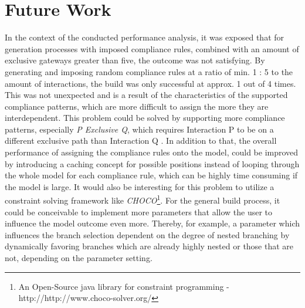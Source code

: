 \section{Future Work}
In the context of the conducted performance analysis, it was exposed that for generation processes with imposed compliance rules, combined with an amount of exclusive gateways greater than five, the outcome was not satisfying. By generating and imposing random compliance rules at a ratio of min. 1 : 5 to the amount of interactions, the build was only successful at approx. 1 out of 4 times. This was not unexpected and is a result of the characteristics of the supported compliance patterns, which are more difficult to assign the more they are interdependent. This problem could be solved by supporting more compliance patterns, especially \textit{P Exclusive Q}, which requires Interaction P to be on a different exclusive path than Interaction Q \cite{compliance_patterns}. In addition to that, the overall performance of assigning the compliance rules onto the model, could be improved by introducing a caching concept for possible positions instead of looping through the whole model for each compliance rule, which can be highly time consuming if the model is large. It would also be interesting for this problem to utilize a constraint solving framework like \textit{CHOCO}\footnote{An Open-Source java library for constraint programming - http://http://www.choco-solver.org/}. For the general build process, it could be conceivable to implement more parameters that allow the user to influence the model outcome even more. Thereby, for example, a parameter which influences the branch selection dependent on the degree of nested branching by dynamically favoring branches which are already highly nested or those that are not, depending on the parameter setting. 
\clearpage